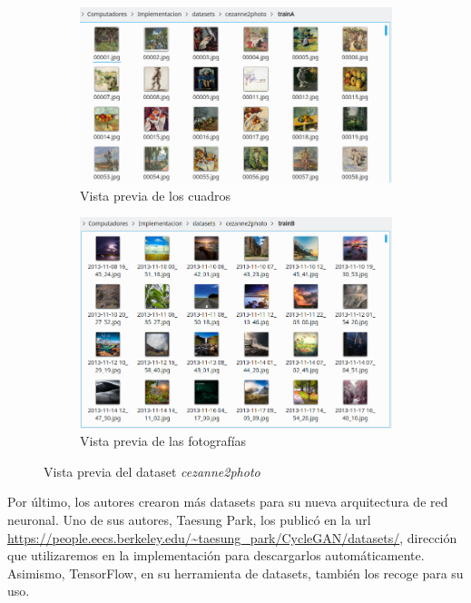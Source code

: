 \documentclass[../main.tex]{subfiles}
\begin{document}
\begin{figure}[!htb]
  \begin{subfigure}[b]{0.49\textwidth}
    \includegraphics[width=1\textwidth]{imagenes/vista_previa_dataset_pintor.png}
    \caption{Vista previa de los cuadros}
    \label{fig:vista_previa_cuadros_cezanne}
  \end{subfigure}
  \hfill
  \begin{subfigure}[b]{0.49\textwidth}
    \includegraphics[width=1\textwidth]{imagenes/vista_previa_dataset_fotos.png}
    \caption{Vista previa de las fotografías}
    \label{fig:vista_previa_fotos_cezanne}
  \end{subfigure}
  \caption{Vista previa del dataset \textit{cezanne2photo}}
  \label{fig:vista_previa_cezanne_dataset}
\end{figure}


Por último, los autores crearon más datasets para su nueva arquitectura de red neuronal. Uno de sus autores, Taesung Park, los publicó en la url \url{https://people.eecs.berkeley.edu/~taesung_park/CycleGAN/datasets/}, dirección que utilizaremos en la implementación para descargarlos automáticamente. Asimismo, TensorFlow, en su herramienta de datasets, también los recoge para su uso.
\end{document}
